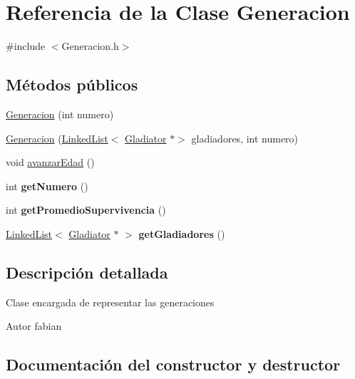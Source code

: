 \hypertarget{classGeneracion}{}\section{Referencia de la Clase Generacion}
\label{classGeneracion}


{\ttfamily \#include $<$Generacion.\+h$>$}

\subsection*{Métodos públicos}
\begin{DoxyCompactItemize}
\item 
\hyperlink{classGeneracion_a995611e496271a872cc93b3e40b6ad85}{Generacion} (int numero)
\item 
\hyperlink{classGeneracion_a07c8c32db2bdc4e77057b8f7a4f28a75}{Generacion} (\hyperlink{classLinkedList}{Linked\+List}$<$ \hyperlink{classGladiator}{Gladiator} $\ast$$>$ gladiadores, int numero)
\item 
void \hyperlink{classGeneracion_adc5987dbce136c83c2f54faf5c3e9b46}{avanzar\+Edad} ()
\item 
\mbox{\label{classGeneracion_ab33670913e67133947c14720c9d44073}} 
int {\bfseries get\+Numero} ()
\item 
\mbox{\label{classGeneracion_a1506e0ab861ca50a0380f1665937a871}} 
int {\bfseries get\+Promedio\+Supervivencia} ()
\item 
\mbox{\label{classGeneracion_a5907ad5ebca2c2674adf94a05b86a5dd}} 
\hyperlink{classLinkedList}{Linked\+List}$<$ \hyperlink{classGladiator}{Gladiator} $\ast$ $>$ {\bfseries get\+Gladiadores} ()
\end{DoxyCompactItemize}


\subsection{Descripción detallada}
Clase encargada de representar las generaciones \begin{DoxyAuthor}{Autor}
fabian 
\end{DoxyAuthor}


\subsection{Documentación del constructor y destructor}
\mbox{\label{classGeneracion_a995611e496271a872cc93b3e40b6ad85}} 

